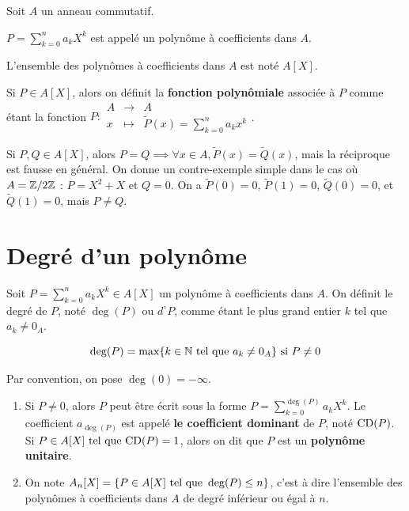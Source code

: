 \documentclass[12pt, a4paper]{report}
\begin{document}
\begin{definition}
    Soit $A$ un anneau commutatif.

    $P = \sum_{k=0}^{n}a_k X^k$ est appelé un polynôme à coefficients dans $A$.

    L'ensemble des polynômes à coefficients dans $A$ est noté $A[X]$.

    Si $P \in A[X]$, alors on définit la \textbf{fonction polynômiale} associée à $P$ comme étant la fonction $P: \begin{array}{ccc}A & \to & A\\
    x & \mapsto & \tilde P(x) = \sum_{k=0}^{n}a_k x^k\end{array}$.
\end{definition}

\begin{remark}
    Si $P,Q \in A[X]$, alors $P=Q \implies \forall x \in A, \tilde P(x) = \tilde Q(x)$, mais la réciproque est fausse en général. On donne un contre-exemple simple dans le cas où $A = \mathbb{Z}/2\mathbb{Z}$ : $P = X^2 + X$ et $Q = 0$. On a $\tilde P(0) = 0$, $\tilde P(1) = 0$, $\tilde Q(0) = 0$, et $\tilde Q(1) = 0$, mais $P \ne Q$.
\end{remark}

\section{Degré d'un polynôme}

\begin{definition}
    Soit $P = \sum_{k=0}^{n}a_k X^k \in A[X]$ un polynôme à coefficients dans $A$. On définit le degré de $P$, noté $\deg(P)$ ou $d^\circ P$, comme étant le plus grand entier $k$ tel que $a_k \ne 0_A$.

    $$\deg(P) = \max\{k \in \mathbb{N} \text{ tel que } a_k \ne 0_A\}\\
    \text{ si } P \ne 0$$
    
    Par convention, on pose $\deg(0) = -\infty$.
\end{definition}

\begin{remark}
    \begin{enumerate}
        \item Si $P \ne 0$, alors $P$ peut être écrit sous la forme $P = \sum_{k=0}^{\deg(P)}a_k X^k$. Le coefficient $a_{\deg(P)}$ est appelé \textbf{le coefficient dominant} de $P$, noté $\mathrm{CD}(P)$. Si $P \in A[X] \text{ tel que } \mathrm{CD}(P) = 1$, alors on dit que $P$ est un \textbf{polynôme unitaire}.
        \item On note $A_n[X] = \{P \in A[X] \text{ tel que } \deg(P) \le n\}$, c'est à dire l'ensemble des polynômes à coefficients dans $A$ de degré inférieur ou égal à $n$.
    \end{enumerate}
\end{remark}
\end{document}
